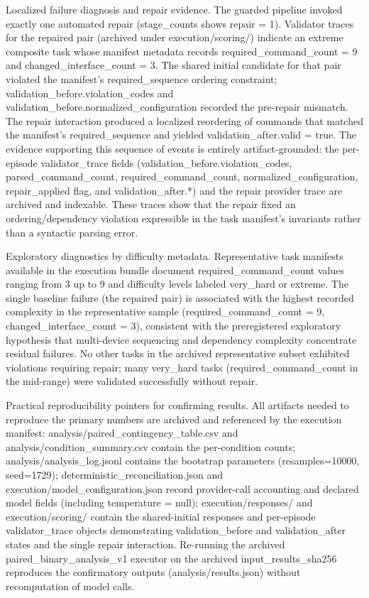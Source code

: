 \documentclass[conference]{IEEEtran}
\begin{document}
Localized failure diagnosis and repair evidence. The guarded pipeline invoked exactly one automated repair (stage\_counts shows repair = 1). Validator traces for the repaired pair (archived under execution/scoring/) indicate an extreme composite task whose manifest metadata records required\_command\_count = 9 and changed\_interface\_count = 3. The shared initial candidate for that pair violated the manifest's required\_sequence ordering constraint; validation\_before.violation\_codes and validation\_before.normalized\_configuration recorded the pre-repair mismatch. The repair interaction produced a localized reordering of commands that matched the manifest's required\_sequence and yielded validation\_after.valid = true. The evidence supporting this sequence of events is entirely artifact-grounded: the per-episode validator\_trace fields (validation\_before.violation\_codes, parsed\_command\_count, required\_command\_count, normalized\_configuration, repair\_applied flag, and validation\_after.*) and the repair provider trace are archived and indexable. These traces show that the repair fixed an ordering/dependency violation expressible in the task manifest's invariants rather than a syntactic parsing error.

Exploratory diagnostics by difficulty metadata. Representative task manifests available in the execution bundle document required\_command\_count values ranging from 3 up to 9 and difficulty levels labeled very\_hard or extreme. The single baseline failure (the repaired pair) is associated with the highest recorded complexity in the representative sample (required\_command\_count = 9, changed\_interface\_count = 3), consistent with the preregistered exploratory hypothesis that multi-device sequencing and dependency complexity concentrate residual failures. No other tasks in the archived representative subset exhibited violations requiring repair; many very\_hard tasks (required\_command\_count in the mid-range) were validated successfully without repair.

Practical reproducibility pointers for confirming results. All artifacts needed to reproduce the primary numbers are archived and referenced by the execution manifest: analysis/paired\_contingency\_table.csv and analysis/condition\_summary.csv contain the per-condition counts; analysis/analysis\_log.jsonl contains the bootstrap parameters (resamples=10000, seed=1729); deterministic\_reconciliation.json and execution/model\_configuration.json record provider-call accounting and declared model fields (including temperature = null); execution/responses/ and execution/scoring/ contain the shared-initial responses and per-episode validator\_trace objects demonstrating validation\_before and validation\_after states and the single repair interaction. Re-running the archived paired\_binary\_analysis\_v1 executor on the archived input\_results\_sha256 reproduces the confirmatory outputs (analysis/results.json) without recomputation of model calls.
\end{document}
